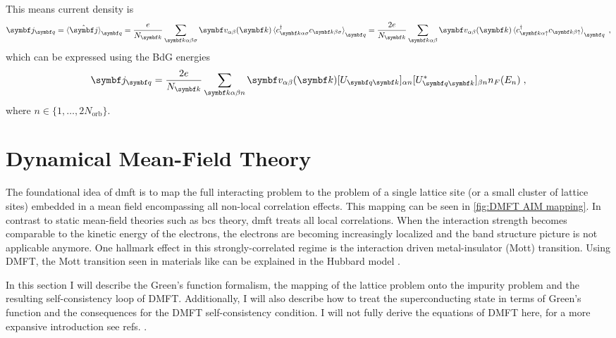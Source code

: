 \documentclass[../notes.tex]{subfiles}
\begin{document}
This means current density is
\begin{align}
	\vb{j}_{\vb{q}} = \braket{\ope{\vb{j}}}_{\vb{q}} = \frac{e}{N_{\vb{k}}} \sum_{\vb{k} \alpha \beta \sigma} \vb{v}_{\alpha \beta} (\vb{k}) \braket{c_{\vb{k} \alpha \sigma}^{\dagger} c_{\vb{k} \beta \sigma}}_{\vb{q}} = \frac{2 e}{N_{\vb{k}}} \sum_{\vb{k} \alpha \beta} \vb{v}_{\alpha \beta} (\vb{k}) \braket{c_{\vb{k} \alpha \uparrow}^{\dagger} c_{\vb{k} \beta \uparrow}}_{\vb{q}} \;,
\end{align}
which can be expressed using the BdG energies
\begin{align}
	\vb{j}_{\vb{q}} = \frac{2 e}{N_{\vb{k}}} \sum_{\vb{k} \alpha \beta n} \vb{v}_{\alpha \beta} (\vb{k}) [U_{\vb{q} \vb{k}}]_{\alpha n} [U_{\vb{q} \vb{k}}^*]_{\beta n} n_F (E_n) \;,
\end{align}
where \(n \in \{1, \ldots, 2 N_{\mathrm{orb}}\}\).

\section{Dynamical Mean-Field Theory}\label{sec:Dynamical Mean-Field Theory}

The foundational idea of \acrfull{dmft} is to map the full interacting problem to the problem of a single lattice site (or a small cluster of lattice sites) embedded in a mean field encompassing all non-local correlation effects.
This mapping can be seen in \cref{fig:DMFT AIM mapping}.
In contrast to static mean-field theories such as \acrshort{bcs} theory, \acrshort{dmft} treats all local correlations.
When the interaction strength becomes comparable to the kinetic energy of the electrons, the electrons are becoming increasingly localized and the band structure picture is not applicable anymore.
One hallmark effect in this strongly-correlated regime is the interaction driven metal-insulator (Mott) transition.
Using DMFT, the Mott transition seen in materials like  \cite{mcwhanMottTransitionCrDoped1969} can be explained in the Hubbard model \cite{rozenbergMottHubbardTransitionInfinite1994}.
	
In this section I will describe the Green's function formalism, the mapping of the lattice problem onto the impurity problem and the resulting self-consistency loop of DMFT.
Additionally, I will also describe how to treat the superconducting state in terms of Green's function and the consequences for the DMFT self-consistency condition.
I will not fully derive the equations of DMFT here, for a more expansive introduction see refs. \cite{pavariniDynamicalMeanfieldTheory2022, georgesDynamicalMeanfieldTheory1996, colemanIntroductionManyBodyPhysics2015, bruusManyBodyQuantumTheory2004}.
\end{document}
